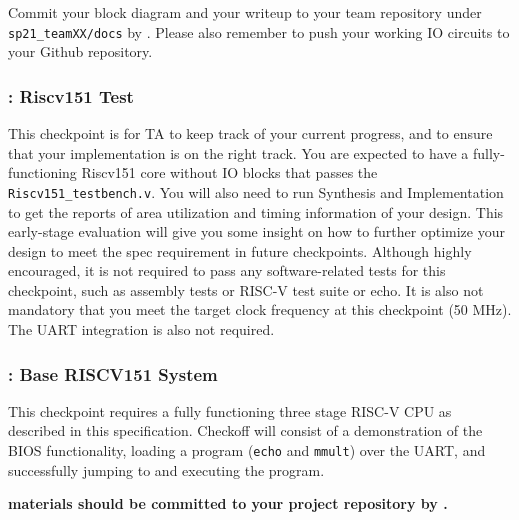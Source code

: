 \documentclass[11pt]{article}
\begin{document}
Commit your block diagram and your writeup to your team repository under \verb|sp21_teamXX/docs| by \blockDiagramDueDate. Please also remember to push your working IO circuits to your Github repository.

\subsubsection{\ALUTaskName: Riscv151 Test}
This checkpoint is for TA to keep track of your current progress, and to ensure that your implementation is on the right track. You are expected to have a fully-functioning Riscv151 core without IO blocks that passes the \verb|Riscv151_testbench.v|. You will also need to run Synthesis and Implementation to get the reports of area utilization and timing information of your design. This early-stage evaluation will give you some insight on how to further optimize your design to meet the spec requirement in future checkpoints. Although highly encouraged, it is not required to pass any software-related tests for this checkpoint, such as assembly tests or RISC-V test suite or echo. It is also not mandatory that you meet the target clock frequency at this checkpoint (50 MHz). The UART integration is also not required.

\subsubsection{\baseCPUTaskName: Base RISCV151 System}
This checkpoint requires a fully functioning three stage RISC-V CPU as described in this specification.
Checkoff will consist of a demonstration of the BIOS functionality, loading a program (\verb|echo| and \verb|mmult|) over the UART, and successfully jumping to and executing the program.

\textbf{\baseCPUTaskName \space materials should be committed to your project repository by \baseCPUDueDate.}
\end{document}
